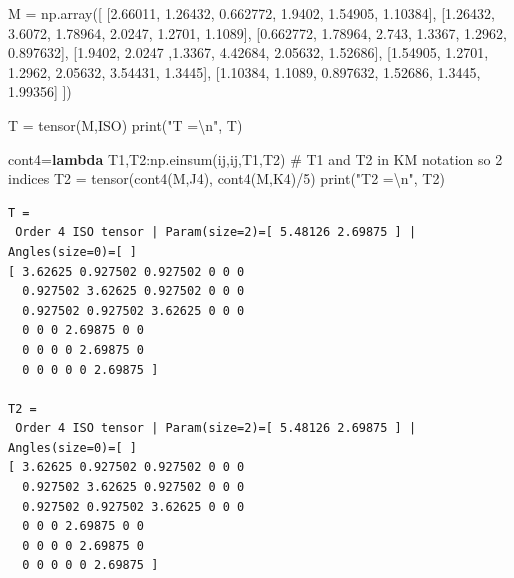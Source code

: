 \documentclass[
  letterpaper,
  DIV=11,
  numbers=noendperiod]{scrreprt}
\newenvironment{Shaded}{\begin{snugshade}}{\end{snugshade}}
\newcommand{\BuiltInTok}[1]{\textcolor[rgb]{0.00,0.23,0.31}{#1}}
\newcommand{\CharTok}[1]{\textcolor[rgb]{0.13,0.47,0.30}{#1}}
\newcommand{\CommentTok}[1]{\textcolor[rgb]{0.37,0.37,0.37}{#1}}
\newcommand{\DecValTok}[1]{\textcolor[rgb]{0.68,0.00,0.00}{#1}}
\newcommand{\FloatTok}[1]{\textcolor[rgb]{0.68,0.00,0.00}{#1}}
\newcommand{\KeywordTok}[1]{\textcolor[rgb]{0.00,0.23,0.31}{\textbf{#1}}}
\newcommand{\NormalTok}[1]{\textcolor[rgb]{0.00,0.23,0.31}{#1}}
\newcommand{\OperatorTok}[1]{\textcolor[rgb]{0.37,0.37,0.37}{#1}}
\newcommand{\StringTok}[1]{\textcolor[rgb]{0.13,0.47,0.30}{#1}}
\begin{document}
\begin{Shaded}
\begin{Highlighting}[]
\NormalTok{M }\OperatorTok{=}\NormalTok{ np.array([ [}\FloatTok{2.66011}\NormalTok{, }\FloatTok{1.26432}\NormalTok{, }\FloatTok{0.662772}\NormalTok{, }\FloatTok{1.9402}\NormalTok{, }\FloatTok{1.54905}\NormalTok{, }\FloatTok{1.10384}\NormalTok{],}
\NormalTok{               [}\FloatTok{1.26432}\NormalTok{, }\FloatTok{3.6072}\NormalTok{, }\FloatTok{1.78964}\NormalTok{, }\FloatTok{2.0247}\NormalTok{, }\FloatTok{1.2701}\NormalTok{, }\FloatTok{1.1089}\NormalTok{], }
\NormalTok{               [}\FloatTok{0.662772}\NormalTok{, }\FloatTok{1.78964}\NormalTok{, }\FloatTok{2.743}\NormalTok{, }\FloatTok{1.3367}\NormalTok{, }\FloatTok{1.2962}\NormalTok{, }\FloatTok{0.897632}\NormalTok{], }
\NormalTok{               [}\FloatTok{1.9402}\NormalTok{, }\FloatTok{2.0247}\NormalTok{ ,}\FloatTok{1.3367}\NormalTok{, }\FloatTok{4.42684}\NormalTok{, }\FloatTok{2.05632}\NormalTok{, }\FloatTok{1.52686}\NormalTok{], }
\NormalTok{               [}\FloatTok{1.54905}\NormalTok{, }\FloatTok{1.2701}\NormalTok{, }\FloatTok{1.2962}\NormalTok{, }\FloatTok{2.05632}\NormalTok{, }\FloatTok{3.54431}\NormalTok{, }\FloatTok{1.3445}\NormalTok{], }
\NormalTok{               [}\FloatTok{1.10384}\NormalTok{, }\FloatTok{1.1089}\NormalTok{, }\FloatTok{0.897632}\NormalTok{, }\FloatTok{1.52686}\NormalTok{, }\FloatTok{1.3445}\NormalTok{, }\FloatTok{1.99356}\NormalTok{] ])}

\NormalTok{T }\OperatorTok{=}\NormalTok{ tensor(M,ISO)}
\BuiltInTok{print}\NormalTok{(}\StringTok{"T =}\CharTok{\textbackslash{}n}\StringTok{"}\NormalTok{, T)}

\NormalTok{cont4}\OperatorTok{=}\KeywordTok{lambda}\NormalTok{ T1,T2:np.einsum(}\StringTok{\textquotesingle{}ij,ij\textquotesingle{}}\NormalTok{,T1,T2) }\CommentTok{\# T1 and T2 in KM notation so 2 indices}
\NormalTok{T2 }\OperatorTok{=}\NormalTok{ tensor(cont4(M,J4), cont4(M,K4)}\OperatorTok{/}\DecValTok{5}\NormalTok{)}
\BuiltInTok{print}\NormalTok{(}\StringTok{"T2 =}\CharTok{\textbackslash{}n}\StringTok{"}\NormalTok{, T2)}
\end{Highlighting}
\end{Shaded}

\begin{verbatim}
T =
 Order 4 ISO tensor | Param(size=2)=[ 5.48126 2.69875 ] | Angles(size=0)=[ ]
[ 3.62625 0.927502 0.927502 0 0 0 
  0.927502 3.62625 0.927502 0 0 0 
  0.927502 0.927502 3.62625 0 0 0 
  0 0 0 2.69875 0 0 
  0 0 0 0 2.69875 0 
  0 0 0 0 0 2.69875 ]

T2 =
 Order 4 ISO tensor | Param(size=2)=[ 5.48126 2.69875 ] | Angles(size=0)=[ ]
[ 3.62625 0.927502 0.927502 0 0 0 
  0.927502 3.62625 0.927502 0 0 0 
  0.927502 0.927502 3.62625 0 0 0 
  0 0 0 2.69875 0 0 
  0 0 0 0 2.69875 0 
  0 0 0 0 0 2.69875 ]
\end{verbatim}
\end{document}
